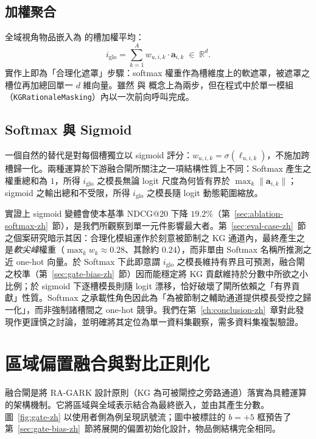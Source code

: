 \subsection{加權聚合}
\label{sec:softmax-agg-zh}

全域視角物品嵌入為  的槽加權平均：
\begin{equation}
\label{eq:iglo-zh}
i_{\mathrm{glo}} = \sum_{k=1}^{A} w_{u, i, k} \cdot \mathbf{a}_{i, k} \;\in\; \mathbb{R}^{d}.
\end{equation}
實作上即為「合理化遮罩」步驟：softmax 權重作為槽維度上的軟遮罩，被遮罩之槽位再加總回單一 $d$ 維向量。雖然  與  概念上為兩步，但在程式中於單一模組（\texttt{KGRationaleMasking}）內以一次前向呼叫完成。

\subsection{Softmax 與 Sigmoid}
\label{sec:softmax-vs-sigmoid-zh}

一個自然的替代是對每個槽獨立以 sigmoid 評分：$w_{u,i,k} = \sigma(\ell_{u,i,k})$，不施加跨槽歸一化。兩種運算於下游融合閘所關注之一項結構性質上不同：Softmax 產生之權重總和為 $1$，所得 $i_{\mathrm{glo}}$ 之模長無論 logit 尺度為何皆有界於 $\max_k \|\mathbf{a}_{i,k}\|$；sigmoid 之輸出總和不受限，所得 $i_{\mathrm{glo}}$ 之模長隨 logit 動態範圍縮放。

實證上 sigmoid 變體會使本基準 NDCG@20 下降 $19.2\%$（第~\ref{sec:ablation-softmax-zh}~節），是我們所觀察到單一元件影響最大者。第~\ref{sec:eval-case-zh}~節之個案研究暗示其因：合理化模組運作於刻意被節制之 KG 通道內，最終產生之是\emph{軟尖峰}權重（$\max_k w_k \approx 0.28$、其餘約 $0.24$），而非單由 Softmax 名稱所推測之近 one-hot 向量。於 Softmax 下此即意謂 $i_{\mathrm{glo}}$ 之模長維持有界且可預測，融合閘之校準（第~\ref{sec:gate-bias-zh}~節）因而能穩定將 KG 貢獻維持於分數中所欲之小比例；於 sigmoid 下逐槽模長則隨 logit 漂移，恰好破壞了閘所依賴之「有界貢獻」性質。Softmax 之承載性角色因此為「為被節制之輔助通道提供模長受控之歸一化」，而非強制諸槽間之 one-hot 競爭。我們在第~\ref{ch:conclusion-zh}~章對此發現作更謹慎之討論，並明確將其定位為單一資料集觀察，需多資料集複製驗證。

\section{區域偏置融合與對比正則化}
\label{sec:gate-zh}

融合閘是將 RA-GARK 設計原則（KG 為可被閘控之旁路通道）落實為具體運算的架構機制。它將區域與全域表示結合為最終嵌入，並由其產生分數。圖~\ref{fig:gate-zh} 以使用者側為例呈現訊號流；圖中被標註的 $b = +5$ 框預告了第~\ref{sec:gate-bias-zh}~節將展開的偏置初始化設計，物品側結構完全相同。

